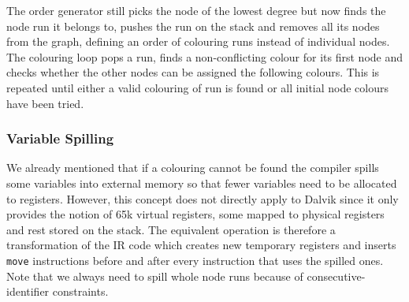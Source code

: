 \documentclass[12pt,twoside,notitlepage]{report}
\begin{document}
The order generator still picks the node of the lowest degree but now finds the node run it belongs to, pushes the run on the stack and removes all its nodes from the graph, defining an order of colouring runs instead of individual nodes. The colouring loop pops a run, finds a non-conflicting colour for its first node and checks whether the other nodes can be assigned the following colours. This is repeated until either a valid colouring of run is found or all initial node colours have been tried.

\subsubsection{Variable Spilling}

We already mentioned that if a colouring cannot be found the compiler spills some variables into external memory so that fewer variables need to be allocated to registers. However, this concept does not directly apply to Dalvik since it only provides the notion of 65k virtual registers, some mapped to physical registers and rest stored on the stack. The equivalent operation is therefore a transformation of the IR code which creates new temporary registers and inserts \verb$move$ instructions before and after every instruction that uses the spilled ones. Note that we always need to spill whole node runs because of consecutive-identifier constraints.
\end{document}
